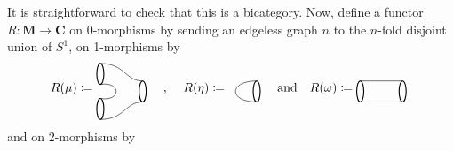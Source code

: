 \documentclass[11pt]{amsart}
\newcommand{\cat}[1]{\mathbf{#1}}
\renewcommand{\t}[1]{\textup{#1}}
\newcommand{\from}{\colon}
\theoremstyle{remark}
\theoremstyle{definition}
\begin{document}
It is straightforward to check 
that this is a bicategory. 
Now, define a functor 
	$R \from \cat{M} \to \cat{C}$ on 
0-morphisms by sending an 
edgeless graph $n$ to the 
$n$-fold disjoint union of $S^1$, 
on 1-morphisms by 
\[
R(\mu) \coloneqq
\raisebox{-0.5\height}{%
	\begin{tikzpicture}
		\draw [thick]  (1.6,-0.2) ellipse (0.1 and 0.3);
	\draw [thick]  (0.4,0.3) ellipse (0.1 and 0.3);
	\draw [thick] (0.4,-0.7) ellipse (0.1 and 0.3);
	\draw (0.4,0) .. controls (1,0.1) and (1,-0.5) .. (0.4,-0.4);
	\draw (0.4,0.6) .. controls (1.1,0.6) and (1.1,0.1) .. (1.6,0.1);
	\draw (0.4,-1) .. controls (1.1,-1) and (1.1,-0.5) .. (1.6,-0.5);
	\end{tikzpicture}
}
	\quad
	\t{, }
	\quad
R(\eta) \coloneqq
\raisebox{-0.5\height}{%
	\begin{tikzpicture}
	\draw [thick]  (0,0) ellipse (0.1 and 0.3);
	\draw (0,0.3) .. controls (-0.8,0.3) and (-0.8,-0.3) .. (0,-0.3);
	\end{tikzpicture}
}
%
%
%
\quad
\t{and}
\quad
%
%
%
R(\omega) \coloneqq
\raisebox{-0.5\height}{%
	\begin{tikzpicture}
	\draw [thick]  (1.6,-0.2) ellipse (0.1 and 0.3);
	\draw [thick] (0.4,-0.2) ellipse (0.1 and 0.3);
	\draw (0.4,0.1) -- (1.6,0.1);
	\draw (0.4,-0.5) -- (1.6,-0.5);
	\end{tikzpicture}
}
\]
and on 2-morphisms by 
\end{document}
